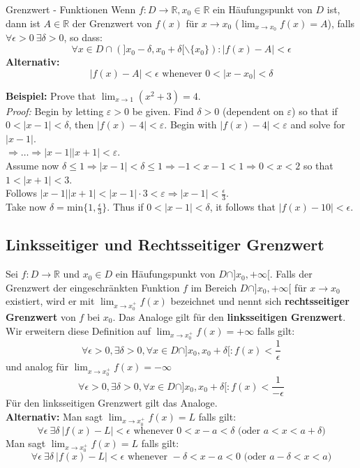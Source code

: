 \documentclass[a4paper,8pt]{extarticle}
\def\R{\mathbb{R}}
\begin{document}
\begin{mainbox}{Grenzwert - Funktionen}
 Wenn $f: D \to \R, x_0 \in \R$ ein Häufungspunkt von $D$ ist, dann ist $A \in \R$ der Grenzwert von $f(x)$ für $x \to x_0$ ($\lim_{x\to x_0} f(x) = A$), falls $\forall \epsilon > 0 \ \exists \delta > 0$, so dass: $$\forall x \in D \cap (]x_0 - \delta, x_0 + \delta[ \backslash \{x_0\}): |f(x) - A| < \epsilon$$
 \textbf{Alternativ:} $$|f(x) - A| < \epsilon \text{ whenever } 0 < |x - x_0| < \delta$$
\end{mainbox}
\noindent\textbf{Beispiel:}
Prove that $\lim_{x \to 1} (x^2 + 3) = 4$.\\
\textit{Proof:} Begin by letting $\varepsilon > 0$ be given. Find $\delta > 0$ (dependent on $\varepsilon$) so that if $0 < |x - 1| < \delta$, then $|f(x) - 4| < \varepsilon$. Begin with $|f(x) - 4| < \varepsilon$ and solve for $|x - 1|$.\\
$\Rightarrow \ldots \Rightarrow |x-1||x+1| < \varepsilon$.\\
Assume now $\delta \leq 1 \Rightarrow |x - 1| < \delta \leq 1 \Rightarrow -1 < x-1 < 1 \Rightarrow 0 < x < 2$ so that $1 < |x+1| < 3$. \\
Follows $|x-1||x+1| < |x-1| \cdot 3 < \varepsilon \Rightarrow |x-1| < \frac{\epsilon}{3}$. \\
Take now $\delta = \text{min} \{ 1, \frac{\epsilon}{3} \}$. Thus if $0 < |x - 1| < \delta$, it follows that $|f(x) - 10| < \epsilon$.

\subsection{Linksseitiger und Rechtsseitiger Grenzwert}
Sei $f: D \to \R$ und $x_0 \in D$ ein Häufungspunkt von $D \cap ]x_0, +\infty[$. Falls der Grenzwert der eingeschränkten Funktion $f$ im Bereich $D \cap ]x_0, +\infty[$ für $x \to x_0$ existiert, wird er mit $\lim_{x\to x_0^+}f(x)$ bezeichnet und nennt sich \textbf{rechtsseitiger Grenzwert} von $f$ bei $x_0$. Das Analoge gilt für den \textbf{linksseitigen Grenzwert}. \\
Wir erweitern diese Definition auf $\lim_{x\to x_0^+}f(x) = + \infty$ falls gilt: $$\forall \epsilon > 0, \exists \delta > 0, \forall x \in D \cap ]x_0, x_0 + \delta[: f(x) < \frac{1}{\epsilon}$$
und analog für $\lim_{x\to x_0^+}f(x) = - \infty$ $$\forall \epsilon > 0, \exists \delta > 0, \forall x \in D \cap ]x_0, x_0 + \delta[: f(x) < \frac{1}{-\epsilon}$$
Für den linksseitigen Grenzwert gilt das Analoge. \\
\textbf{Alternativ:} Man sagt $\lim_{x \to x_0^+} f(x) = L$ falls gilt: $$\forall \epsilon \ \exists \delta \ |f(x) - L| < \epsilon \text{ whenever } 0 < x - a < \delta \text{ (oder } a < x  < a + \delta )$$
Man sagt $\lim_{x \to x_0^+} f(x) = L$ falls gilt: $$\forall \epsilon \ \exists \delta \ |f(x) - L| < \epsilon \text{ whenever } -\delta < x - a < 0 \text{ (oder } a - \delta < x  < a )$$
\end{document}
